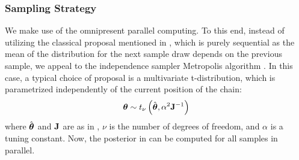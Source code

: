 \subsubsection{Sampling Strategy} 
We make use of the omnipresent parallel computing. To this end, instead of utilizing the classical proposal mentioned in , which is purely sequential as the mean of the distribution for the next sample draw depends on the previous sample, we appeal to the independence sampler Metropolis algorithm \cite{gelman2004}. In this case, a typical choice of proposal is a multivariate t-distribution, which is parametrized independently of the current position of the chain:
\begin{equation} \elabel{proposal}
  \vparam \sim \studentst{\nu}{\hat{\vparam}}{\alpha^2 \mOI^{-1}}
\end{equation}
where $\hat{{\boldsymbol\theta}}$ and $\mathbf{J}$ are as in , $\nu$ is the number of degrees of freedom, and $\alpha$ is a tuning constant. Now, the posterior in  can be computed for all samples in parallel.
